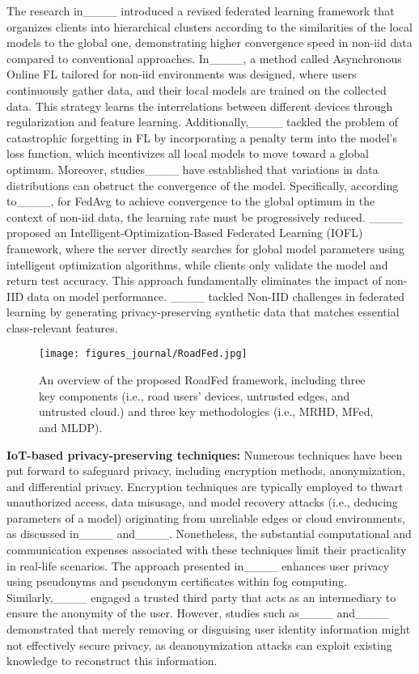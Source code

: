 The research in____ introduced a revised federated learning framework that organizes clients into hierarchical clusters according to the similarities of the local models to the global one, demonstrating higher convergence speed in non-iid data compared to conventional approaches. In____, a method called Asynchronous Online FL tailored for non-iid environments was designed, where users continuously gather data, and their local models are trained on the collected data. This strategy learns the interrelations between different devices through regularization and feature learning. Additionally,____ tackled the problem of catastrophic forgetting in FL by incorporating a penalty term into the model’s loss function, which incentivizes all local models to move toward a global optimum. Moreover, studies____ have established that variations in data distributions can obstruct the convergence of the model. Specifically, according to____, for FedAvg to achieve convergence to the global optimum in the context of non-iid data, the learning rate must be progressively reduced.
____ proposed an Intelligent-Optimization-Based Federated Learning (IOFL) framework, where the server directly searches for global model parameters using intelligent optimization algorithms, while clients only validate the model and return test accuracy. This approach fundamentally eliminates the impact of non-IID data on model performance. 
____ tackled Non-IID challenges in federated learning by generating privacy-preserving synthetic data that matches essential class-relevant features.


\begin{figure*}[t]
\vspace{-2mm}
\centering
\texttt{[image: figures\_journal/RoadFed.jpg]}
\caption{An overview of the proposed RoadFed framework, including three key components (i.e., road users' devices, untrusted edges, and untrusted cloud.) and three key methodologies (i.e., MRHD, MFed, and MLDP).}
\label{fi:RoadFedFramework}
\vspace{-2mm}
\end{figure*}


\textbf{IoT-based privacy-preserving techniques:}
Numerous techniques have been put forward to safeguard privacy, including encryption methods, anonymization, and differential privacy. Encryption techniques are typically employed to thwart unauthorized access, data misusage, and model recovery attacks (i.e., deducing parameters of a model) originating from unreliable edges or cloud environments, as discussed in____ and____. Nonetheless, the substantial computational and communication expenses associated with these techniques limit their practicality in real-life scenarios. The approach presented in____ enhances user privacy using pseudonyms and pseudonym certificates within fog computing. Similarly,____ engaged a trusted third party that acts as an intermediary to ensure the anonymity of the user. However, studies such as____ and____ demonstrated that merely removing or disguising user identity information might not effectively secure privacy, as deanonymization attacks can exploit existing knowledge to reconstruct this information.

